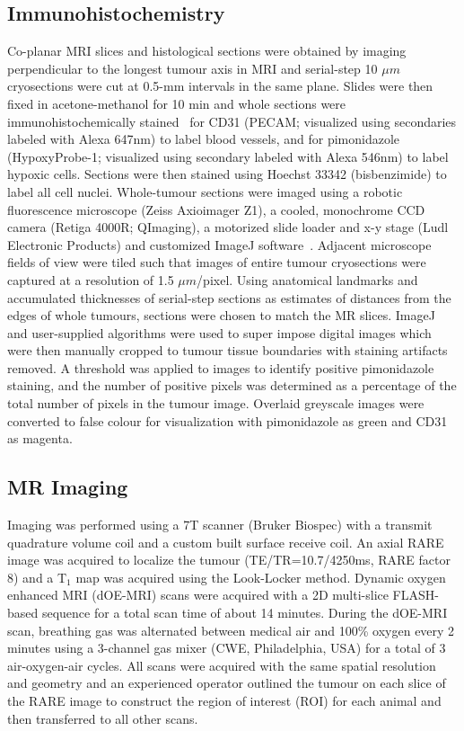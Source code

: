\subsection{Immunohistochemistry}
Co-planar MRI slices and histological sections were obtained by imaging perpendicular to the longest tumour axis in MRI and serial-step 10 $\mu m$ cryosections were cut at 0.5-mm intervals in the same plane.
Slides were then fixed in acetone-methanol for 10 min and whole sections were immunohistochemically stained~\cite{Kalra:2017is} for CD31 (PECAM; visualized using secondaries labeled with Alexa 647nm) to label blood vessels, and for pimonidazole (HypoxyProbe-1; visualized using secondary labeled with Alexa 546nm) to label hypoxic cells. Sections were then stained using Hoechst 33342 (bisbenzimide) to label all cell nuclei.
Whole-tumour sections were imaged using a robotic fluorescence microscope (Zeiss Axioimager Z1), a cooled, monochrome CCD camera (Retiga 4000R; QImaging), a motorized slide loader and x-y stage (Ludl Electronic Products) and customized ImageJ software~\cite{Collins:2007jr}. 
Adjacent microscope fields of view were tiled such that images of entire tumour cryosections were captured at a resolution of 1.5 $\mu m$/pixel. 
Using anatomical landmarks and accumulated thicknesses of serial-step sections as estimates of distances from the edges of whole tumours, sections were chosen to match the MR slices. 
ImageJ and user-supplied algorithms were used to super impose digital images which were then manually cropped to tumour tissue boundaries with staining artifacts removed. 
A threshold was applied to images to identify positive pimonidazole staining, and the number of positive pixels was determined as a percentage of the total number of pixels in the tumour image. 
Overlaid greyscale images were converted to false colour for visualization with pimonidazole as green and CD31 as magenta.

\subsection{MR Imaging}
Imaging was performed using a 7T scanner (Bruker Biospec) with a transmit quadrature volume coil and a custom built surface receive coil. 
An axial RARE image was acquired to localize the tumour (TE/TR=10.7/4250ms, RARE factor 8) and a T$_1$ map was acquired using the Look-Locker method.
Dynamic oxygen enhanced MRI (\ac{dOE-MRI}) scans were acquired with a 2D multi-slice FLASH-based sequence for a total scan time of about 14 minutes.
During the \ac{dOE-MRI} scan, breathing gas was alternated between medical air and 100\% oxygen every 2 minutes using a 3-channel gas mixer (CWE, Philadelphia, USA) for a total of 3 air-oxygen-air cycles.
All scans were acquired with the same spatial resolution and geometry and an experienced operator outlined the tumour on each slice of the RARE image to construct the region of interest (ROI) for each animal and then transferred to all other scans.

